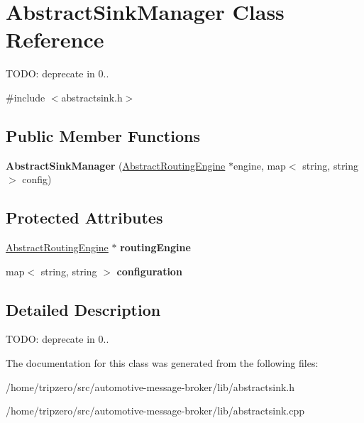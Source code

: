 \hypertarget{classAbstractSinkManager}{\section{Abstract\-Sink\-Manager Class Reference}
\label{classAbstractSinkManager}
}


T\-O\-D\-O\-: deprecate in 0..  




{\ttfamily \#include $<$abstractsink.\-h$>$}

\subsection*{Public Member Functions}
\begin{DoxyCompactItemize}
\item 
\hypertarget{classAbstractSinkManager_a8c2b065455e7392bbef66056e492cf54}{{\bfseries Abstract\-Sink\-Manager} (\hyperlink{classAbstractRoutingEngine}{Abstract\-Routing\-Engine} $\ast$engine, map$<$ string, string $>$ config)}\label{classAbstractSinkManager_a8c2b065455e7392bbef66056e492cf54}

\end{DoxyCompactItemize}
\subsection*{Protected Attributes}
\begin{DoxyCompactItemize}
\item 
\hypertarget{classAbstractSinkManager_aa4951761c33e7012c3a0e72e099354b3}{\hyperlink{classAbstractRoutingEngine}{Abstract\-Routing\-Engine} $\ast$ {\bfseries routing\-Engine}}\label{classAbstractSinkManager_aa4951761c33e7012c3a0e72e099354b3}

\item 
\hypertarget{classAbstractSinkManager_ac329710da75b1c757584ec42a8072ea4}{map$<$ string, string $>$ {\bfseries configuration}}\label{classAbstractSinkManager_ac329710da75b1c757584ec42a8072ea4}

\end{DoxyCompactItemize}


\subsection{Detailed Description}
T\-O\-D\-O\-: deprecate in 0.. 

The documentation for this class was generated from the following files\-:\begin{DoxyCompactItemize}
\item 
/home/tripzero/src/automotive-\/message-\/broker/lib/abstractsink.\-h\item 
/home/tripzero/src/automotive-\/message-\/broker/lib/abstractsink.\-cpp\end{DoxyCompactItemize}
